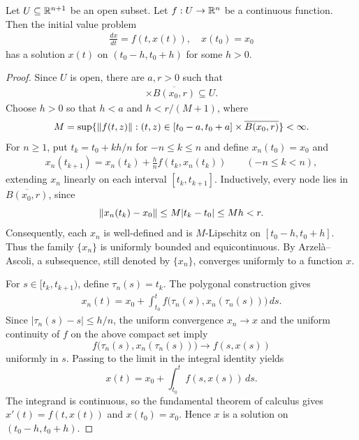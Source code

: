 \begin{theorem}
    Let $U \subseteq \mathbb{R}^{n+1}$ be an open subset. Let $f:U \to \mathbb{R}^{n}$ be a continuous function. Then the initial value problem
    \begin{align}
        \frac{dx}{dt} = f(t,x(t)), \quad x(t_{0}) = x_{0}
    \end{align}
    has a solution $x(t)$ on $(t_{0}-h,t_{0}+h)$ for some $h > 0$.
\end{theorem}
\begin{proof}
    Since $U$ is open, there are $a,r>0$ such that
    \begin{align}
        [t_{0}-a,t_{0}+a]\times \overline{B(x_{0},r)}\subseteq U.
    \end{align}
    Choose $h>0$ so that $h<a$ and $h<r/(M+1)$, where
    \begin{align}
        M=\sup\{\left\lVert f(t,z)\right\rVert:(t,z)\in [t_{0}-a,t_{0}+a]\times
        \overline{B(x_{0},r)}\}<\infty.
    \end{align}
    For $n\geq1$, put $t_{k}=t_{0}+kh/n$ for $-n\leq k\leq n$ and define
    $x_{n}(t_{0})=x_{0}$ and
    \begin{align}
        x_{n}(t_{k+1})=x_{n}(t_{k})+\frac{h}{n}f(t_{k},x_{n}(t_{k}))
        \qquad(-n\leq k<n),
    \end{align}
    extending $x_{n}$ linearly on each interval $[t_{k},t_{k+1}]$.
    Inductively, every node lies in $\overline{B(x_{0},r)}$, since
    \[
        \left\lVert x_{n}(t_{k})-x_{0}\right\rVert\leq M|t_{k}-t_{0}|
        \leq Mh<r.
    \]
    Consequently, each $x_n$ is well-defined and is $M$-Lipschitz on
    $[t_{0}-h,t_{0}+h]$. Thus the family $\{x_n\}$ is uniformly bounded and
    equicontinuous. By Arzelà--Ascoli, a subsequence, still denoted by
    $\{x_n\}$, converges uniformly to a function $x$.

    For $s\in[t_k,t_{k+1})$, define $\tau_n(s)=t_k$. The polygonal
    construction gives
    \begin{align}
        x_n(t)=x_0+\int_{t_0}^{t}
        f\bigl(\tau_n(s),x_n(\tau_n(s))\bigr)\,ds.
    \end{align}
    Since $|\tau_n(s)-s|\leq h/n$, the uniform convergence $x_n\to x$ and
    the uniform continuity of $f$ on the above compact set imply
    \[
        f\bigl(\tau_n(s),x_n(\tau_n(s))\bigr)\longrightarrow f(s,x(s))
    \]
    uniformly in $s$. Passing to the limit in the integral identity yields
    \[
        x(t)=x_0+\int_{t_0}^{t}f(s,x(s))\,ds.
    \]
    The integrand is continuous, so the fundamental theorem of calculus gives
    $x'(t)=f(t,x(t))$ and $x(t_0)=x_0$. Hence $x$ is a solution on
    $(t_0-h,t_0+h)$.
\end{proof}